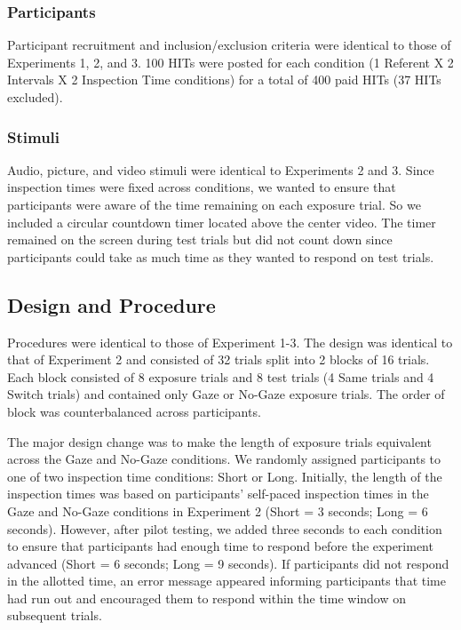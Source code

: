\documentclass[oneside]{report}
\begin{document}
\hypertarget{participants-3}{%
\subsubsection{Participants}\label{participants-3}}

Participant recruitment and inclusion/exclusion criteria were identical
to those of Experiments 1, 2, and 3. 100 HITs were posted for each
condition (1 Referent X 2 Intervals X 2 Inspection Time conditions) for
a total of 400 paid HITs (37 HITs excluded).

\hypertarget{stimuli-3}{%
\subsubsection{Stimuli}\label{stimuli-3}}

Audio, picture, and video stimuli were identical to Experiments 2 and 3.
Since inspection times were fixed across conditions, we wanted to ensure
that participants were aware of the time remaining on each exposure
trial. So we included a circular countdown timer located above the
center video. The timer remained on the screen during test trials but
did not count down since participants could take as much time as they
wanted to respond on test trials.

\hypertarget{design-and-procedure-3}{%
\subsection{Design and Procedure}\label{design-and-procedure-3}}

Procedures were identical to those of Experiment 1-3. The design was
identical to that of Experiment 2 and consisted of 32 trials split into
2 blocks of 16 trials. Each block consisted of 8 exposure trials and 8
test trials (4 Same trials and 4 Switch trials) and contained only Gaze
or No-Gaze exposure trials. The order of block was counterbalanced
across participants.

The major design change was to make the length of exposure trials
equivalent across the Gaze and No-Gaze conditions. We randomly assigned
participants to one of two inspection time conditions: Short or Long.
Initially, the length of the inspection times was based on participants'
self-paced inspection times in the Gaze and No-Gaze conditions in
Experiment 2 (Short = 3 seconds; Long = 6 seconds). However, after pilot
testing, we added three seconds to each condition to ensure that
participants had enough time to respond before the experiment advanced
(Short = 6 seconds; Long = 9 seconds). If participants did not respond
in the allotted time, an error message appeared informing participants
that time had run out and encouraged them to respond within the time
window on subsequent trials.
\end{document}
